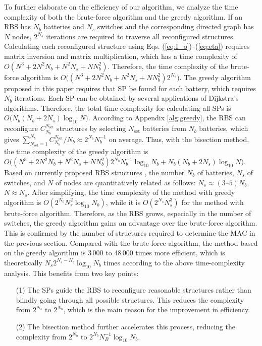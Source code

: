 \documentclass{article}
\begin{document}
To further elaborate on the efficiency of our algorithm, we analyze the time complexity of both the brute-force algorithm and the greedy algorithm.
If an RBS has $N_b$ batteries and $N_s$ switches and the corresponding directed graph has $N$ nodes,  $2^{N_s}$ iterations are required to traverse all reconfigured structures.
Calculating each reconfigured structure using Eqs. (\ref{eq:I_o})--(\ref{eq:eta}) requires matrix inversion and matrix multiplication, which has a time complexity of $O(N^3+2N^2N_b+N^2N_s+NN^2_b)$.
Therefore, the time complexity of the brute-force algorithm is $O\bm((N^3+2N^2N_b+N^2N_s+NN^2_b)2^{N_s}\bm)$.
The greedy algorithm proposed in this paper requires  that SP be found for each battery, which requires $N_b$ iterations.
Each SP can be obtained by several applications of Dijkstra's algorithms.
Therefore, the total time complexity for calculating all SPs is $O\bm(N_b(N_b+2N_s)\log_{10} N\bm)$.
According to  Appendix \ref{alg:greedy}, the RBS can reconfigure $C^{N_{\text{set}}}_{N_b}$ structures by selecting $N_{\text{set}}$ batteries from $N_b$ batteries, which gives $\sum^{N_b}_{N_{\text{set}}=1}C^{N_{\text{set}}}_{N_b}/N_b \approx 2^{N_b} N_b^{-1}$ on average.
Thus, with the bisection method, the time complexity of the greedy algorithm is $O\bm((N^3+2N^2N_b+N^2N_s+NN^2_b) 2^{N_b} N_b^{-1} \log_{10} N_b+N_b(N_b+2N_s)\log_{10} N\bm)$.
Based on currently proposed RBS structures \cite{ciNovelDesignAdaptive2007,alahmadBatterySwitchArray2008,kimDependableEfficientScalable2010b,kimBalancedReconfigurationStorage2011a,taesickimSeriesconnectedSelfreconfigurableMulticell2012a,6843711}, the number $N_b$ of batteries, $N_s$ of switches, and $N$ of nodes are quantitatively related as follows: $N_s \approx (3\text{--} 5)N_b$, $N \approx N_s$. 
After simplifying, the time complexity of the method with greedy algorithm is $O(2^{N_b}N_s^2\log_{10} N_b)$, while it is $O(2^{N_s}N_s^3)$ for the method with brute-force algorithm.
Therefore, as the RBS grows, especially in the number of switches, the greedy algorithm gains an advantage over the brute-force algorithm.
This is confirmed by the number of structures required to determine the MAC in the previous section. 
Compared with the brute-force algorithm, the method based on the greedy algorithm is 3\,000 to 48\,000 times more efficient, which is theoretically $N_s 2^{N_s - N_b} \log_{10} N_b$ times according to the above time-complexity analysis.
This benefits from two key points:
\begin{enumerate}
    \item[(1)] The SPs guide the RBS to reconfigure reasonable structures rather than blindly going through all possible structures. This reduces the complexity from $2^{N_s}$ to $2^{N_b}$, which is the main reason for the improvement in efficiency. 
    \item[(2)] The bisection method further accelerates this process, reducing the complexity from $2^{N_b}$ to $2^{N_b} N_B^{-1} \log_{10} N_b$.
\end{enumerate}
\end{document}
